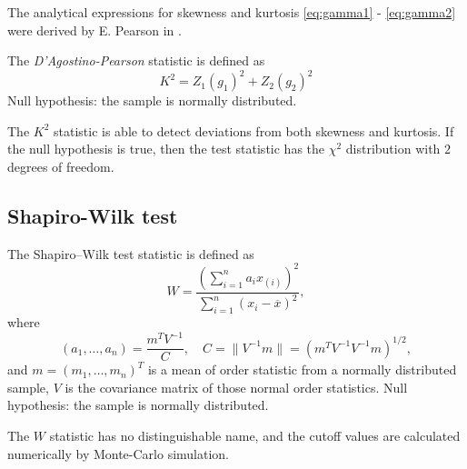             The analytical expressions for skewness and kurtosis \eqref{eq:gamma1} - \eqref{eq:gamma2} were derived by E. Pearson in \cite{Pearson1931}.
            \begin{definition}
                The \emph{D'Agostino-Pearson} statistic is defined as 
                \begin{equation}
                    K^2 = Z_1(g_1)^2 + Z_2(g_2)^2
                \end{equation}
                Null hypothesis: the sample is normally distributed.
            \end{definition}
    
            \begin{nb}
                The $K^2$ statistic is able to detect deviations from both skewness and kurtosis. 
                If the null hypothesis is true, then the test statistic has the $\chi^2$ 
                distribution with $2$ degrees of freedom. 
            \end{nb}
    
        \subsection{Shapiro-Wilk test}
            \begin{definition}
                The Shapiro–Wilk test statistic is defined as
                \begin{equation}
                    W = \frac{\left(\sum_{i=1}^n a_i x_{(i)}\right)^2}{\sum_{i=1}^n (x_i-\overline{x})^2},
                \end{equation}
                where
                \begin{equation*}
                    (a_1, \dots, a_n) = \frac{m^{T} V^{-1}}{C}, \quad C = \| V^{-1} m \| = (m^{T} V^{-1}V^{-1}m)^{1/2},
                \end{equation*}
                and $m = (m_1, \dots, m_n)^{T}$ is a mean of order statistic from a normally distributed sample, $V$ is the covariance matrix of those normal order statistics. 
                Null hypothesis: the sample is normally distributed.
            \end{definition}
    
            \begin{nb}
                The $W$ statistic has no distinguishable name, and the cutoff values are calculated numerically by Monte-Carlo simulation.
            \end{nb}